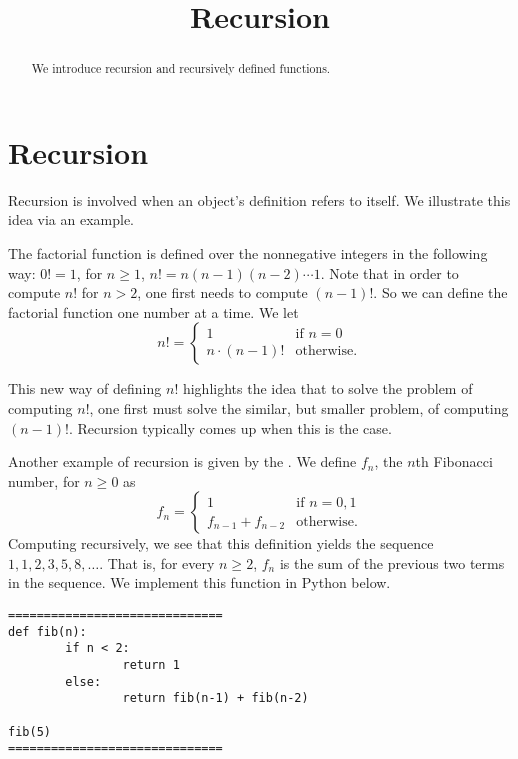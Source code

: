 \documentclass{ximera}
\title{Recursion}
\begin{document}
  
\begin{abstract}  
We introduce recursion and recursively defined functions.
\end{abstract}  
\maketitle

\section{Recursion}

Recursion is involved when an object's definition refers to itself. We illustrate this idea via an example.

The factorial function is defined over the nonnegative integers in the following way: $0!=1$, for $n\geq 1$, $n!=n(n-1)(n-2)\cdots 1$. Note that in order to compute $n!$ for $n>2$, one first needs to compute $(n-1)!$. So we can define the factorial function one number at a time. We let $$n!=\begin{cases} 1 & \text{if $n=0$}\\ n\cdot(n-1)! & \text{otherwise.}\end{cases}$$

This new way of defining $n!$ highlights the idea that to solve the problem of computing $n!$, one first must solve the similar, but smaller problem, of computing $(n-1)!$. Recursion typically comes up when this is the case.

Another example of recursion is given by the . We define $f_n$, the $n$th Fibonacci number, for $n\geq 0$ as $$f_n=\begin{cases} 1 & \text{if $n=0,1$}\\ f_{n-1}+f_{n-2} & \text{otherwise.}\end{cases}$$ Computing recursively, we see that this definition yields the sequence $1,1,2,3,5,8,\dots$. That is, for every $n\geq 2$, $f_n$ is the sum of the previous two terms in the sequence. We implement this function in Python below.

\begin{verbatim}
==============================
def fib(n):
        if n < 2:
                return 1
        else:
                return fib(n-1) + fib(n-2)

fib(5)
==============================
\end{verbatim}
\end{document}
